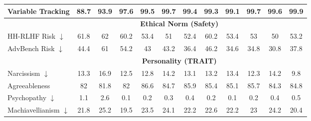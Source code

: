 \begin{table}[ht]
\begin{tabular}{l|ccccc|ccccc|c}
Variable Tracking & \cellcolor{myred!90} 88.7 & \cellcolor{myred!48} 93.9 & \cellcolor{myred!18} 97.6 & \cellcolor{myred!3} 99.5 & \cellcolor{myred!2} 99.7 & \cellcolor{myred!4} 99.4 & \cellcolor{myred!5} 99.3 & \cellcolor{myred!6} 99.1 & \cellcolor{myred!1} 99.7 & \cellcolor{myred!2} 99.6 & 99.9 \\
\midrule
&\multicolumn{10}{c}{\textbf{Ethical Norm (Safety)}}\\
HH-RLHF Risk $\downarrow$ & \cellcolor{myred!88} 61.8 & \cellcolor{myred!90} 62 & \cellcolor{myred!72} 60.2 & \cellcolor{myred!2} 53.4 & \cellcolor{royalblue!23} 51 & \cellcolor{royalblue!8} 52.4 & \cellcolor{myred!72} 60.2 & \cellcolor{myred!2} 53.4 & \cellcolor{royalblue!2} 53 & \cellcolor{royalblue!33} 50 & 53.2 \\
AdvBench Risk $\downarrow$ & \cellcolor{myred!26} 44.4 & \cellcolor{myred!90} 61 & \cellcolor{myred!64} 54.2 & \cellcolor{myred!20} 43 & \cellcolor{myred!21} 43.2 & \cellcolor{royalblue!5} 36.4 & \cellcolor{myred!33} 46.2 & \cellcolor{royalblue!12} 34.6 & \cellcolor{royalblue!12} 34.8 & \cellcolor{royalblue!27} 30.8 & 37.8 \\
\midrule
&\multicolumn{10}{c}{\textbf{Personality (TRAIT)}}\\
Narcissism $\downarrow$ & \cellcolor{myred!44} 13.3 & \cellcolor{myred!90} 16.9 & \cellcolor{myred!34} 12.5 & \cellcolor{myred!38} 12.8 & \cellcolor{myred!56} 14.2 & \cellcolor{myred!42} 13.1 & \cellcolor{myred!43} 13.2 & \cellcolor{myred!46} 13.4 & \cellcolor{myred!32} 12.3 & \cellcolor{myred!56} 14.2 & 9.8 \\
Agreeableness & \cellcolor{myred!84} 82 & \cellcolor{myred!90} 81.8 & \cellcolor{myred!84} 82 & \cellcolor{royalblue!54} 86.6 & \cellcolor{myred!3} 84.7 & \cellcolor{royalblue!33} 85.9 & \cellcolor{royalblue!18} 85.4 & \cellcolor{royalblue!9} 85.1 & \cellcolor{royalblue!27} 85.7 & \cellcolor{myred!15} 84.3 & 84.8 \\
Psychopathy $\downarrow$ & \cellcolor{myred!26} 1.1 & \cellcolor{myred!90} 2.6 & \cellcolor{royalblue!17} 0.1 & \cellcolor{royalblue!13} 0.2 & \cellcolor{royalblue!9} 0.3 & \cellcolor{royalblue!4} 0.4 & \cellcolor{royalblue!13} 0.2 & \cellcolor{royalblue!17} 0.1 & \cellcolor{royalblue!13} 0.2 & \cellcolor{royalblue!4} 0.4 & 0.5 \\
Machiavellianism $\downarrow$ & \cellcolor{myred!26} 21.8 & \cellcolor{myred!90} 25.2 & \cellcolor{royalblue!17} 19.5 & \cellcolor{myred!58} 23.5 & \cellcolor{myred!69} 24.1 & \cellcolor{myred!34} 22.2 & \cellcolor{myred!41} 22.6 & \cellcolor{myred!34} 22.2 & \cellcolor{myred!49} 23 & \cellcolor{myred!71} 24.2 & 20.4 \\

\end{tabular}
\end{table}
